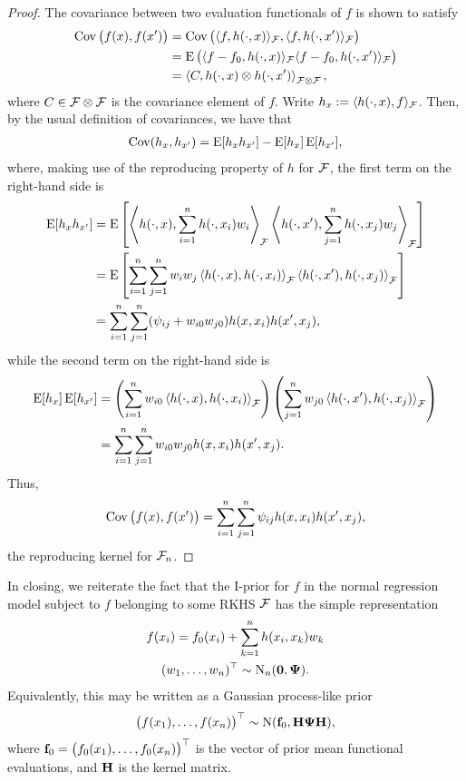 \begin{proof}
  The covariance between two evaluation functionals of $f$ is shown to satisfy 
  \begin{align*}
    \operatorname{Cov}\big(f(x),f(x')\big) 
    &= \operatorname{Cov}\big(\langle f,h(\cdot,x)\rangle_{{\mathcal F}}, \langle f,h(\cdot,x')\rangle_{{\mathcal F}} \big) \\
    &= \operatorname{E}\big(\langle f-f_0,h(\cdot,x)\rangle_{{\mathcal F}}\langle f-f_0,h(\cdot,x')\rangle_{{\mathcal F}} \big) \\
    &= \left\langle C, h(\cdot,x) \otimes h(\cdot,x') \right\rangle_{{\mathcal F} \otimes {\mathcal F}},
  \end{align*}
  where $C \in {\mathcal F}\otimes{\mathcal F}$ is the covariance element of $f$.
  Write $h_{x} := \langle h(\cdot,x),f \rangle_{{\mathcal F}}$. 
  Then, by the usual definition of covariances, we have that 
  \begin{align*}
    \operatorname{Cov}(h_x,h_{x'}) = \operatorname{E}[h_xh_{x'}] - \operatorname{E}[h_x]\operatorname{E}[h_{x'}],
  \end{align*}
  where, making use of the reproducing property of $h$ for ${\mathcal F}$, the first term on the right-hand side is
  \begin{align*}
    \operatorname{E}[h_xh_{x'}] 
    &= \operatorname{E} \left[ 
    \left\langle h(\cdot,x), \sum_{i=1}^n h(\cdot,x_i)w_i \right\rangle_{{\mathcal F}} 
    \left\langle h(\cdot,x'), \sum_{j=1}^n h(\cdot,x_j)w_j \right\rangle_{{\mathcal F}} 
    \right] \\
    &= \operatorname{E} \left[ 
    \sum_{i=1}^n\sum_{j=1}^n w_iw_j \left\langle  h(\cdot,x), h(\cdot,x_i) \right\rangle_{{\mathcal F}} 
     \left\langle h(\cdot,x'), h(\cdot,x_j)\right\rangle_{{\mathcal F}} 
    \right] \\
    &= \sum_{i=1}^n\sum_{j=1}^n (\psi_{ij} + w_{i0}w_{j0}) h(x,x_i) h(x',x_j),
  \end{align*}
  while the second term on the right-hand side is
  \begin{align*}
    \operatorname{E}[h_x]\operatorname{E}[h_{x'}]
    &= \left( \sum_{i=1}^n w_{i0} \left\langle  h(\cdot,x), h(\cdot,x_i)  \right\rangle_{{\mathcal F}} \right)
    \left( \sum_{j=1}^n w_{j0} \left\langle  h(\cdot,x'), h(\cdot,x_j)  \right\rangle_{{\mathcal F}} \right) \\
    &= \sum_{i=1}^n \sum_{j=1}^n w_{i0}w_{j0} h(x,x_i)h(x',x_j).
  \end{align*}  
  Thus,
  \[
    \operatorname{Cov}\big( f(x),f(x') \big) = \sum_{i=1}^n\sum_{j=1}^n \psi_{ij} h(x,x_i) h(x',x_j),
  \]
  the reproducing kernel for ${\mathcal F}_n$.
\end{proof}

In closing, we reiterate the fact that the I-prior for $f$ in the normal regression model subject to $f$ belonging to some RKHS ${\mathcal F}$ has the simple representation
\begin{align*}
  \begin{gathered}
    f(x_i) = f_0(x_i) + \sum_{k=1}^n h(x_i,x_k)w_k \\
    (w_1,\dots,w_n)^\top \sim \operatorname{N}_n({\mathbf 0},{\bm\Psi}).
  \end{gathered}
\end{align*}
Equivalently, this may be written as a Gaussian process-like prior 
\[
  \big(f(x_1),\dots,f(x_n) \big)^\top \sim \operatorname{N}({\mathbf f}_0,{\mathbf H}{\bm\Psi}{\mathbf H}),
\]
where ${\mathbf f}_0 = \big(f_0(x_1),\dots,f_0(x_n) \big)^\top$ is the vector of prior mean functional evaluations, and ${\mathbf H}$ is the kernel matrix.
